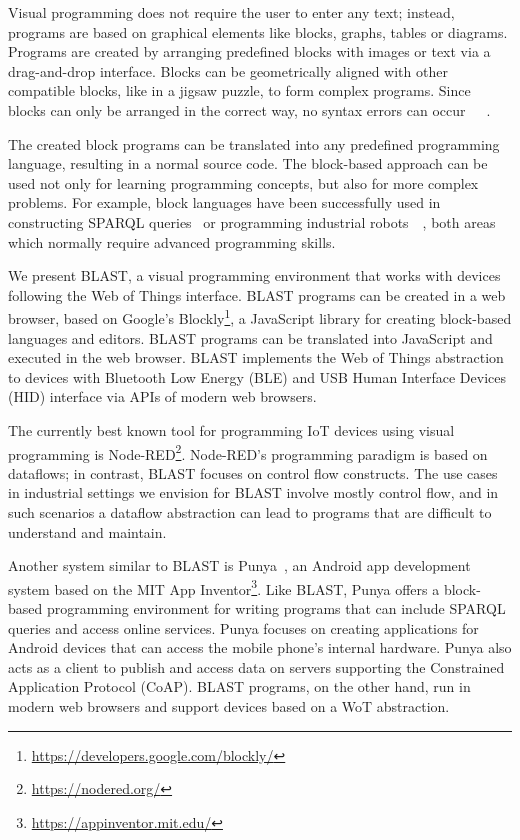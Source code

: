 \documentclass[runningheads]{llncs}
\begin{document}
Visual programming does not require the user to enter any text; instead, programs are based on graphical elements like blocks, graphs, tables or diagrams.
Programs are created by arranging predefined blocks with images or text via a drag-and-drop interface.
Blocks can be geometrically aligned with other compatible blocks, like in a jigsaw puzzle, to form complex programs.
Since blocks can only be arranged in the correct way, no syntax errors can occur~\cite{10.11453341221}~\cite{maloney2010scratch}~\cite{10.1145/1089733.1089734}.

The created block programs can be translated into any predefined programming language, resulting in a normal source code. 
The block-based approach can be used not only for learning programming concepts, but also for more complex problems.
For example, block languages have been successfully used in constructing SPARQL queries~\cite{7369012} or programming industrial robots~\cite{8120406}~\cite{tomlein2017visual}, both areas which normally require advanced programming skills.

We present BLAST, a visual programming environment that works with devices following the Web of Things interface.
BLAST programs can be created in a web browser, based on Google's Blockly\footnote{\url{https://developers.google.com/blockly/}}, a JavaScript library for creating block-based languages and editors.
BLAST programs can be translated into JavaScript and executed in the web browser.
BLAST implements the Web of Things abstraction to devices with Bluetooth Low Energy (BLE) and USB Human Interface Devices (HID) interface via APIs of modern web browsers.

The currently best known tool for programming IoT devices using visual programming is Node-RED\footnote{\url{https://nodered.org/}}.
Node-RED's programming paradigm is based on dataflows; in contrast, BLAST focuses on control flow constructs.
The use cases in industrial settings we envision for BLAST involve mostly control flow, and in such scenarios a dataflow abstraction can lead to programs that are difficult to understand and maintain.

Another system similar to BLAST is Punya~\cite{patton2021punya}, an Android app development system based on the MIT App Inventor\footnote{\url{https://appinventor.mit.edu/}}.
Like BLAST, Punya offers a block-based programming environment for writing programs that can include SPARQL queries and access online services.
Punya focuses on creating applications for Android devices that can access the mobile phone's internal hardware.
Punya also acts as a client to publish and access data on servers supporting the Constrained Application Protocol (CoAP).
BLAST programs, on the other hand, run in modern web browsers and support devices based on a WoT abstraction.
\end{document}
